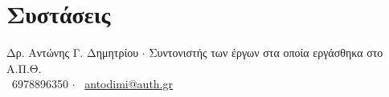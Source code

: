 \documentclass[a4paper,10pt,twoside]{article}
\begin{document}
\section{Συστάσεις}
Δρ. Αντώνης Γ. Δημητρίου $\cdot$ Συντονιστής των έργων στα οποία εργάσθηκα στο Α.Π.Θ. \\
\faPhone \ 6978896350 $\cdot$ \faEnvelopeO \ \href{mailto:antodimi@auth.gr}{antodimi@auth.gr} \\
\end{document}
